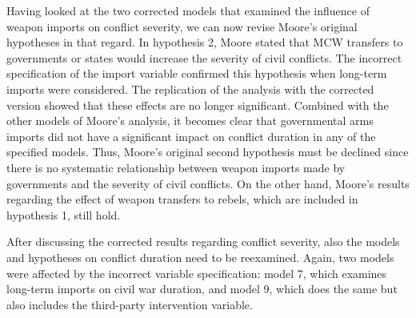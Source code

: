 \documentclass[
]{article}
\newenvironment{Shaded}{\begin{snugshade}}{\end{snugshade}}
\newcommand{\AttributeTok}[1]{\textcolor[rgb]{0.77,0.63,0.00}{#1}}
\newcommand{\DecValTok}[1]{\textcolor[rgb]{0.00,0.00,0.81}{#1}}
\newcommand{\FunctionTok}[1]{\textcolor[rgb]{0.00,0.00,0.00}{#1}}
\newcommand{\NormalTok}[1]{#1}
\newcommand{\OtherTok}[1]{\textcolor[rgb]{0.56,0.35,0.01}{#1}}
\newcommand{\SpecialCharTok}[1]{\textcolor[rgb]{0.00,0.00,0.00}{#1}}
\begin{document}
Having looked at the two corrected models that examined the influence of
weapon imports on conflict severity, we can now revise Moore's original
hypotheses in that regard. In hypothesis 2, Moore stated that MCW
transfers to governments or states would increase the severity of civil
conflicts. The incorrect specification of the import variable confirmed
this hypothesis when long-term imports were considered. The replication
of the analysis with the corrected version showed that these effects are
no longer significant. Combined with the other models of Moore's
analysis, it becomes clear that governmental arms imports did not have a
significant impact on conflict duration in any of the specified models.
Thus, Moore's original second hypothesis must be declined since there is
no systematic relationship between weapon imports made by governments
and the severity of civil conflicts. On the other hand, Moore's results
regarding the effect of weapon transfers to rebels, which are included
in hypothesis 1, still hold.

After discussing the corrected results regarding conflict severity, also
the models and hypotheses on conflict duration need to be reexamined.
Again, two models were affected by the incorrect variable specification:
model 7, which examines long-term imports on civil war duration, and
model 9, which does the same but also includes the third-party
intervention variable.

\begin{Shaded}
\end{Shaded}
\end{document}
